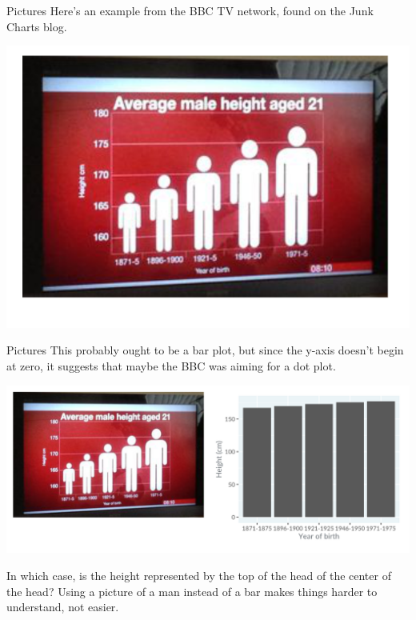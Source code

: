 \documentclass[
  ignorenonframetext,
]{beamer}
\begin{document}
\begin{frame}{Pictures}
\label{pictures}
Here's an example from the BBC TV network, found on the Junk Charts
blog.

\includegraphics{../images/im112.png}
\end{frame}

\begin{frame}{Pictures}
\label{pictures-1}
This probably ought to be a bar plot, but since the y-axis doesn't begin
at zero, it suggests that maybe the BBC was aiming for a dot plot.

\includegraphics{../images/im113.png}

In which case, is the height represented by the top of the head of the
center of the head? Using a picture of a man instead of a bar makes
things harder to understand, not easier.
\end{frame}
\end{document}
